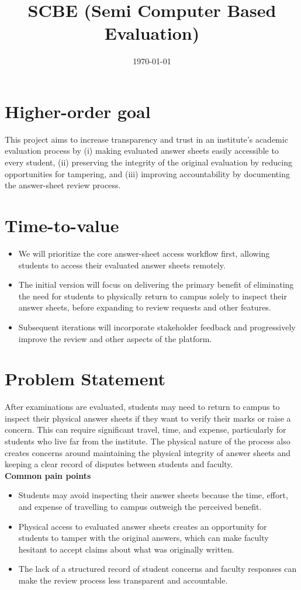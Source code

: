 \documentclass[11pt,a4paper]{article}
\title{SCBE (Semi Computer Based Evaluation)}
\author{
  \specifyauthor{Gurneet Singh Ahuja}{1024170014}{gahuja\_be24@thapar.edu}
  \and
  \specifyauthor{Alla Harshith}{1024170007}{aharshith\_be24@thapar.edu}
  \and
  \specifyauthor{Arpit Goyal}{1024170021}{agoyal6\_be24@thapar.edu}
}
\date{\today}
\begin{document}
\maketitle

\section{Higher-order goal}
This project aims to increase transparency and trust in an institute's academic evaluation process by (i) making evaluated answer sheets easily accessible to every student, (ii) preserving the integrity of the original evaluation by reducing opportunities for tampering, and (iii) improving accountability by documenting the answer-sheet review process.

\section{Time-to-value}
\begin{itemize}[leftmargin=0.7cm]
    \item We will prioritize the core answer-sheet access workflow first, allowing students to access their evaluated answer sheets remotely.
    \item The initial version will focus on delivering the primary benefit of eliminating the need for students to physically return to campus solely to inspect their answer sheets, before expanding to review requests and other features.
    \item Subsequent iterations will incorporate stakeholder feedback and progressively improve the review and other aspects of the platform.
\end{itemize}

\section{Problem Statement}
After examinations are evaluated, students may need to return to campus to inspect their physical answer sheets if they want to verify their marks or raise a concern. This can require significant travel, time, and expense, particularly for students who live far from the institute. The physical nature of the process also creates concerns around maintaining the physical integrity of answer sheets and keeping a clear record of disputes between students and faculty.\\

\textbf{Common pain points}
\begin{itemize}[leftmargin=0.7cm]
    \item Students may avoid inspecting their answer sheets because the time, effort, and expense of travelling to campus outweigh the perceived benefit.
    \item Physical access to evaluated answer sheets creates an opportunity for students to tamper with the original answers, which can make faculty hesitant to accept claims about what was originally written.
    \item The lack of a structured record of student concerns and faculty responses can make the review process less transparent and accountable.
\end{itemize}
\end{document}
